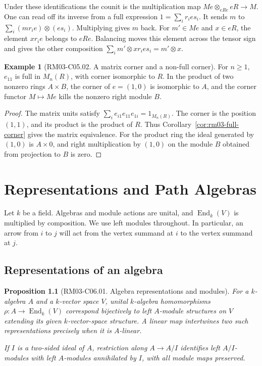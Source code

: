 \documentclass[11pt,oneside,openany]{book}
\newtheorem{proposition}[theorem]{Proposition}
\theoremstyle{definition}
\newtheorem{example}[theorem]{Example}
\theoremstyle{remark}
\begin{document}
Under these identifications the counit is the multiplication map
\(Me\otimes_{eRe}eR\to M\). One can read off its inverse from a full
expression \(1=\sum_i r_i e s_i\). It sends \(m\) to
\(\sum_i (m r_i e)\otimes(e s_i)\). Multiplying gives \(m\) back.
For \(m'\in Me\) and \(x\in eR\), the element \(x r_i e\) belongs to
\(eRe\). Balancing moves this element across the tensor sign and
gives the other composition
\(\sum_i m'\otimes x r_i e s_i=m'\otimes x\).

\begin{example}[RM03-C05.02. A matrix corner and a non-full corner]
\label{ex:rm03-corners}
For \(n\geq 1\), \(e_{11}\) is full in \(M_n(R)\), with corner
isomorphic to \(R\). In the product of two nonzero rings \(A\times B\),
the corner of \(e=(1,0)\) is isomorphic to \(A\), and the corner
functor \(M\mapsto Me\) kills the nonzero right module \(B\).
\end{example}
\begin{proof}
The matrix units satisfy \(\sum_i e_{i1}e_{11}e_{1i}=1_{M_n(R)}\).
The corner is the position \((1,1)\), and its product is the product
of \(R\). Thus Corollary~\ref{cor:rm03-full-corner} gives the matrix
equivalence. For the product ring the ideal generated by \((1,0)\)
is \(A\times 0\), and right multiplication by \((1,0)\) on the
module \(B\) obtained from projection to \(B\) is zero.
\end{proof}
\chapter{Representations and Path Algebras}
\label{ch:rm03-quivers}

Let \(k\) be a field. Algebras and module actions are unital, and
\(\operatorname{End}_k(V)\) is multiplied by composition. We use left
modules throughout. In particular, an arrow from \(i\) to \(j\) will
act from the vertex summand at \(i\) to the vertex summand at \(j\).

\section{Representations of an algebra}

\begin{proposition}[RM03-C06.01. Algebra representations and modules]
\label{prop:rm03-algebra-representations}
For a \(k\)-algebra \(A\) and a \(k\)-vector space \(V\), unital
\(k\)-algebra homomorphisms
\(\rho\colon A\to\operatorname{End}_k(V)\) correspond bijectively to
left \(A\)-module structures on \(V\) extending its given
\(k\)-vector-space structure. A linear map intertwines two such
representations precisely when it is \(A\)-linear.

If \(I\) is a two-sided ideal of \(A\), restriction along
\(A\to A/I\) identifies left \(A/I\)-modules with left \(A\)-modules
annihilated by \(I\), with all module maps preserved.
\end{proposition}
\end{document}
